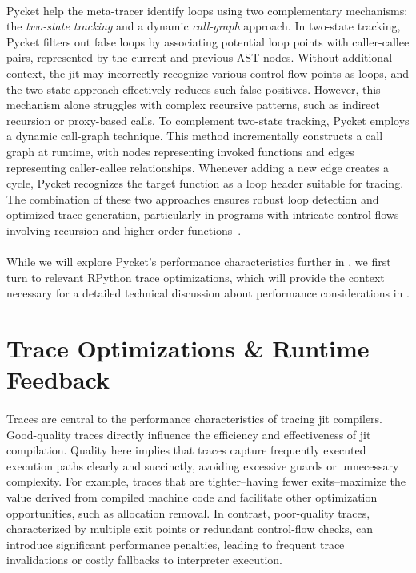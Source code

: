         \paragraph{}%
            Pycket help the meta-tracer identify loops using two complementary mechanisms: the \emph{two-state tracking} and a dynamic \emph{call-graph} approach. In two-state tracking, Pycket filters out false loops by associating potential loop points with caller-callee pairs, represented by the current and previous AST nodes. Without additional context, the \gls{jit} may incorrectly recognize various control-flow points as loops, and the two-state approach effectively reduces such false positives. However, this mechanism alone struggles with complex recursive patterns, such as indirect recursion or proxy-based calls. To complement two-state tracking, Pycket employs a dynamic call-graph technique. This method incrementally constructs a call graph at runtime, with nodes representing invoked functions and edges representing caller-callee relationships. Whenever adding a new edge creates a cycle, Pycket recognizes the target function as a loop header suitable for tracing. The combination of these two approaches ensures robust loop detection and optimized trace generation, particularly in programs with intricate control flows involving recursion and higher-order functions~\cite{pycketmain, pycketmain2}.

        \paragraph{}%
            While we will explore Pycket’s performance characteristics further in , we first turn to relevant RPython trace optimizations, which will provide the context necessary for a detailed technical discussion about performance considerations in .

    \section[\texorpdfstring{Trace Optimizations \& Runtime Feedback}{Trace Optimizations}]{Trace Optimizations \& Runtime Feedback}

        \paragraph{}%
            Traces are central to the performance characteristics of tracing \gls{jit} compilers. Good-quality traces directly influence the efficiency and effectiveness of \gls{jit} compilation. Quality here implies that traces capture frequently executed execution paths clearly and succinctly, avoiding excessive guards or unnecessary complexity. For example, traces that are tighter--having fewer exits--maximize the value derived from compiled machine code and facilitate other optimization opportunities, such as allocation removal. In contrast, poor-quality traces, characterized by multiple exit points or redundant control-flow checks, can introduce significant performance penalties, leading to frequent trace invalidations or costly fallbacks to interpreter execution. \cite{runtime-feedback:11}

